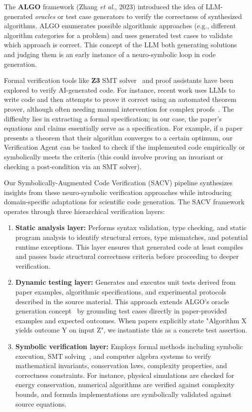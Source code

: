 \documentclass{ieeeaccess}
\begin{document}
The \textbf{ALGO} framework (Zhang \emph{et al.}, 2023) introduced the idea of LLM-generated \textit{oracles} or test case generators to verify the correctness of synthesized algorithms. ALGO enumerates possible algorithmic approaches (e.g., different algorithm categories for a problem) and uses generated test cases to validate which approach is correct. This concept of the LLM both generating solutions and judging them is an early instance of a neuro-symbolic loop in code generation.

Formal verification tools like \textbf{Z3} SMT solver~\cite{de2021z3} and proof assistants have been explored to verify AI-generated code. For instance, recent work uses LLMs to write code and then attempts to prove it correct using an automated theorem prover, although often needing manual intervention for complex proofs~\cite{polu2023formal}. The difficulty lies in extracting a formal specification; in our case, the paper's equations and claims essentially serve as a specification. For example, if a paper presents a theorem that their algorithm converges to a certain optimum, our Verification Agent can be tasked to check if the implemented code empirically or symbolically meets the criteria (this could involve proving an invariant or checking a post-condition via an SMT solver).

Our Symbolically-Augmented Code Verification (SACV) pipeline synthesizes insights from these neuro-symbolic verification approaches while introducing domain-specific adaptations for scientific code generation. The SACV framework operates through three hierarchical verification layers:

\begin{enumerate}
\item \textbf{Static analysis layer:} Performs syntax validation, type checking, and static program analysis to identify structural errors, type mismatches, and potential runtime exceptions. This layer ensures that generated code at least compiles and passes basic structural correctness criteria before proceeding to deeper verification.
\item \textbf{Dynamic testing layer:} Generates and executes unit tests derived from paper examples, algorithmic specifications, and experimental protocols described in the source material. This approach extends ALGO's oracle generation concept~\cite{zhang2023algo} by grounding test cases directly in paper-provided examples and expected outcomes. When papers explicitly state "Algorithm X yields outcome Y on input Z", we instantiate this as a concrete test assertion.
\item \textbf{Symbolic verification layer:} Employs formal methods including symbolic execution, SMT solving~\cite{de2021z3}, and computer algebra systems to verify mathematical invariants, conservation laws, complexity properties, and correctness constraints. For instance, physical simulations are checked for energy conservation, numerical algorithms are verified against complexity bounds, and formula implementations are symbolically validated against source equations.
\end{enumerate}
\end{document}
